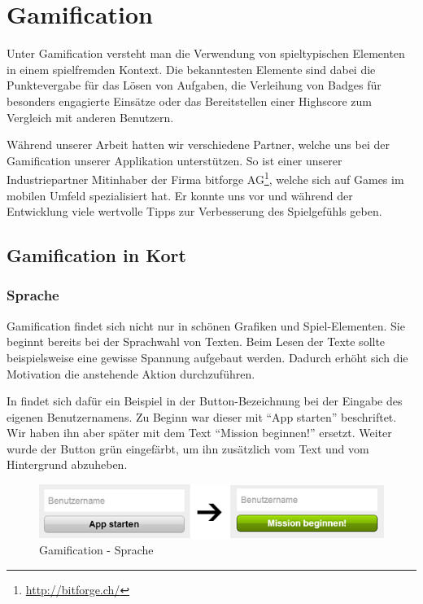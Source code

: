 \chapter{Gamification}
\label{gamification}

Unter Gamification versteht man die Verwendung von spieltypischen Elementen in einem spielfremden Kontext.
Die bekanntesten Elemente sind dabei die Punktevergabe für das Lösen von Aufgaben, die Verleihung von Badges für besonders engagierte Einsätze oder das Bereitstellen einer Highscore zum Vergleich mit anderen Benutzern.

Während unserer Arbeit hatten wir verschiedene Partner, welche uns bei der Gamification unserer Applikation unterstützen.
So ist einer unserer Industriepartner Mitinhaber der Firma bitforge AG\footnote{\url{http://bitforge.ch/}}, welche sich auf Games im mobilen Umfeld spezialisiert hat.
Er konnte uns vor und während der Entwicklung viele wertvolle Tipps zur Verbesserung des Spielgefühls geben.

\section{Gamification in Kort}
\subsection{Sprache}
Gamification findet sich nicht nur in schönen Grafiken und Spiel-Elementen.
Sie beginnt bereits bei der Sprachwahl von Texten.
Beim Lesen der Texte sollte beispielsweise eine gewisse Spannung aufgebaut werden.
Dadurch erhöht sich die Motivation die anstehende Aktion durchzuführen.

In \kort findet sich dafür ein Beispiel in der Button-Bezeichnung bei der Eingabe des eigenen Benutzernamens.
Zu Beginn war dieser mit "`App starten"' beschriftet.
Wir haben ihn aber später mit dem Text "`Mission beginnen!"' ersetzt.
Weiter wurde der Button grün eingefärbt, um ihn zusätzlich vom Text und vom Hintergrund abzuheben.

\begin{figure}[H]
	\centering
	\includegraphics{images/gamification/gamification-lang-firststeps}
	\caption{Gamification - Sprache}
	\label{gamification-lang-firststeps}
\end{figure}

